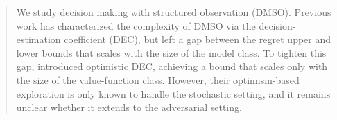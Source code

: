 \begin{abstract}




We study decision making with structured observation (DMSO). Previous work \citep{foster2021statistical, foster2023tight} has characterized the complexity of DMSO via the decision-estimation coefficient (DEC), but left a gap between the regret upper and lower bounds that scales with the size of the model class. To tighten this gap, \cite{foster2024model} introduced optimistic DEC, achieving a bound that scales only with the size of the value-function class. However, their optimism-based exploration is only known to handle the stochastic setting, and it remains unclear whether it extends to the adversarial setting.


\end{abstract}
